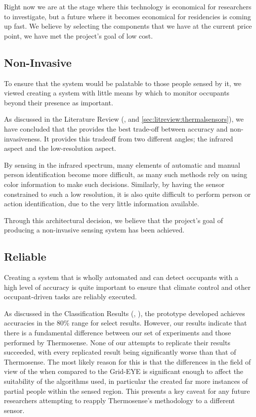 \documentclass[../thesis/thesis.tex]{subfiles}
\begin{document}
Right now we are at the stage where this technology is economical for researchers to investigate, but a future where it becomes economical for residencies is coming up fast. We believe by selecting the components that we have at the current price point, we have met the project's goal of low cost.

\subsection{Non-Invasive}
To ensure that the system would be palatable to those people sensed by it, we viewed creating a system with little means by which to monitor occupants beyond their presence as important.

As discussed in the Literature Review (,  and \ref{sec:litreview:thermalsensors}), we have concluded that the \mlx provides the best trade-off between accuracy and non-invasiveness. It provides this tradeoff from two different angles; the infrared aspect and the low-resolution aspect. 

By sensing in the infrared spectrum, many elements of automatic and manual person identification become more difficult, as many such methods rely on using color information to make such decisions. Similarly, by having the sensor constrained to such a low resolution, it is also quite difficult to perform person or action identification, due to the very little information available.

Through this architectural decision, we believe that the project's goal of producing a non-invasive sensing system has been achieved.

\subsection{Reliable}
Creating a system that is wholly automated and can detect occupants with a high level of accuracy is quite important to ensure that climate control and other occupant-driven tasks are reliably executed.

As discussed in the Classification Results (, ), the prototype developed achieves accuracies in the 80\% range for select results. However, our results indicate that there is a fundamental difference between our set of experiments and those performed by Thermosense. None of our attempts to replicate their results succeeded, with every replicated result being significantly worse than that of Thermosense. The most likely reason for this is that the differences in the field of view of the \mlx when compared to the Grid-EYE is significant enough to affect the suitability of the algorithms used, in particular the \mlx created far more instances of partial people within the sensed region. This presents a key caveat for any future researchers attempting to reapply Thermosense's methodology to a different sensor.
\end{document}
